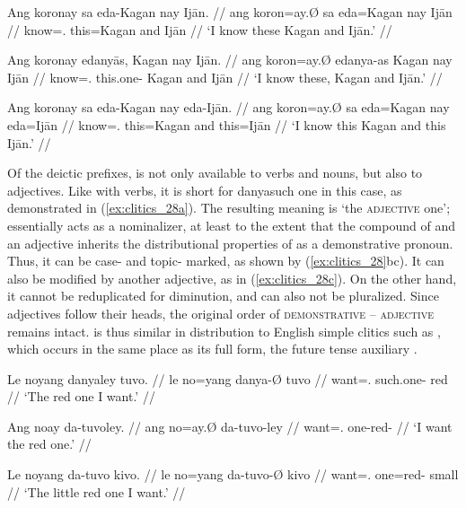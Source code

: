 \pex\label{ex:clitics_27}
\a\label{ex:clitics_27a}\begingl
	\gla Ang koronay sa eda-​Kagan nay Ijān. //
	\glb ang koron=ay.Ø sa eda=Kagan nay Ijān //
	\glc \AgtT{} know=\Fsg{}.\Top{} \Parg{} this=​Kagan and Ijān //
	\glft `I know these Kagan and Ijān.' //
\endgl

\a\label{ex:clitics_27b}\begingl
	\gla Ang koronay edanyās, Kagan nay Ijān. //
	\glb ang koron=ay.Ø edanya-as Kagan nay Ijān //
	\glc \AgtT{} know=\Fsg{}.\Top{} this.one-\Parg{} Kagan and Ijān //
	\glft `I know these, Kagan and Ijān.' //
\endgl

\a\label{ex:clitics_27c}\begingl
	\gla Ang koronay sa eda-​Kagan nay eda-​Ijān. //
	\glb ang koron=ay.Ø sa eda=​Kagan nay eda=Ijān //
	\glc \AgtT{} know=\Fsg{}.\Top{} \Parg{} this=​Kagan and this=​Ijān //
	\glft `I know this Kagan and this Ijān.' //
\endgl
\xe

Of the deictic prefixes,  is not only available to verbs and
nouns, but also to adjectives. Like with verbs, it is short for 
{danya}{such one} in this case, as demonstrated in (\ref{ex:clitics_28a}). The
resulting meaning is `the \textsc{adjective} one';  essentially
acts as a nominalizer, at least to the extent that the compound of
 and an adjective inherits the distributional properties of
 as a demonstrative pronoun. Thus, it can be case- and topic-
marked, as shown by (\ref{ex:clitics_28}bc). It can also be modified by another
adjective, as in (\ref{ex:clitics_28c}). On the other hand, it cannot be
reduplicated for diminution, and can also not be pluralized. Since adjectives
follow their heads, the original order of \textsc{demonstrative} --
\textsc{adjective} remains intact.  is thus similar in
distribution to English simple clitics such as , which occurs in the
same place as its full form, the future tense auxiliary .

\pex\label{ex:clitics_28}
\a\label{ex:clitics_28a}\begingl
	\gla Le noyang danyaley tuvo. //
	\glb le no=yang danya-Ø tuvo //
	\glc \PatTI{} want=\Fsg{}.\Aarg{} such.one-\Top{} red //
	\glft `The red one I want.' //
\endgl

\a\label{ex:clitics_28b}\begingl
	\gla Ang noay da-tuvoley. //
	\glb ang no=ay.Ø da-tuvo-ley //
	\glc \AgtT{} want=\Fsg{}.\Top{} one-red-\PargI{} //
	\glft `I want the red one.' //
\endgl

\a\label{ex:clitics_28c}\begingl
	\gla Le noyang da-tuvo kivo. //
	\glb le no=yang da-tuvo-Ø kivo //
	\glc \PatTI{} want=\Fsg{}.\Aarg{} one=red-\Top{} small //
	\glft `The little red one I want.' //
\endgl
\xe

